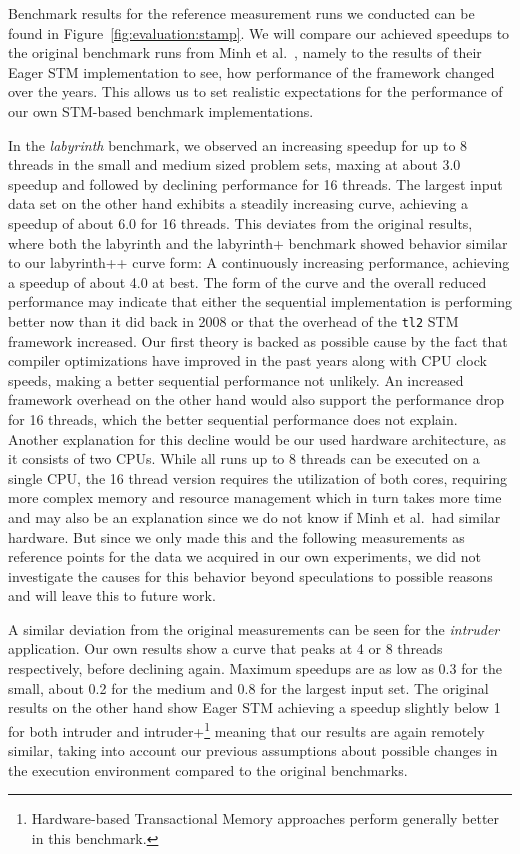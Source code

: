 Benchmark results for the reference measurement runs we conducted can be found in Figure~\ref{fig:evaluation:stamp}.
We will compare our achieved speedups to the original benchmark runs from Minh et al.~\cite{minh2008stamp}, namely to the results of their Eager STM implementation to see, how performance of the framework changed over the years.
This allows us to set realistic expectations for the performance of our own STM-based benchmark implementations.

In the \emph{labyrinth} benchmark, we observed an increasing speedup for up to 8 threads in the small and medium sized problem sets, maxing at about 3.0 speedup and followed by declining performance for 16 threads.
The largest input data set on the other hand exhibits a steadily increasing curve, achieving a speedup of about 6.0 for 16 threads.
This deviates from the original results, where both the labyrinth and the labyrinth+ benchmark showed behavior similar to our labyrinth++ curve form: A continuously increasing performance, achieving a speedup of about 4.0 at best.
The form of the curve and the overall reduced performance may indicate that either the sequential implementation is performing better now than it did back in 2008 or that the overhead of the \texttt{tl2} STM framework increased.
Our first theory is backed as possible cause by the fact that compiler optimizations have improved in the past years along with CPU clock speeds, making a better sequential performance not unlikely.
An increased framework overhead on the other hand would also support the performance drop for 16 threads, which the better sequential performance does not explain.
Another explanation for this decline would be our used hardware architecture, as it consists of two CPUs.
While all runs up to 8 threads can be executed on a single CPU, the 16 thread version requires the utilization of both cores, requiring more complex memory and resource management which in turn takes more time and may also be an explanation since we do not know if Minh et al.\ had similar hardware.
But since we only made this and the following measurements as reference points for the data we acquired in our own experiments, we did not investigate the causes for this behavior beyond speculations to possible reasons and will leave this to future work.

A similar deviation from the original measurements can be seen for the \emph{intruder} application.
Our own results show a curve that peaks at 4 or 8 threads respectively, before declining again.
Maximum speedups are as low as 0.3 for the small, about 0.2 for the medium and 0.8 for the largest input set.
The original results on the other hand show Eager STM achieving a speedup slightly below 1 for both intruder and intruder+\footnote{Hardware-based Transactional Memory approaches perform generally better in this benchmark.} meaning that our results are again remotely similar, taking into account our previous assumptions about possible changes in the execution environment compared to the original benchmarks.

